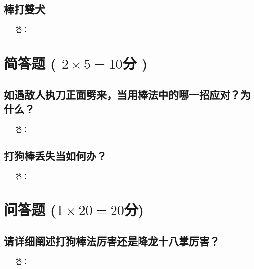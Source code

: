 \documentclass[a3]{swfuexam}
\begin{document}
\subsection*{棒打雙犬}
\begin{itemize}
\item[答：] 
\end{itemize}

\vspace{20em}

\vfill%
\section{简答题 ( $2\times 5=10$分 )}

\subsection{如遇敌人执刀正面劈来，当用棒法中的哪一招应对？为什么？}
\begin{itemize}
\item[答：] 
\end{itemize}

\vspace{20em}
\vfill%
\subsection{打狗棒丢失当如何办？}
\begin{itemize}
\item[答：] 
\end{itemize}

\vspace{20em}
\vfill%
\section{问答题 ($1\times{}20=20$分)}
\subsection{请详细阐述打狗棒法厉害还是降龙十八掌厉害？}
\begin{itemize}
\item[答：] 
\end{itemize}

\vspace{20em}
\end{document}

